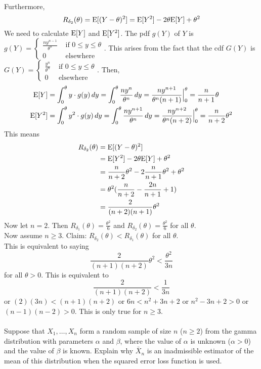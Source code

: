 \documentclass[12pt]{article}
\begin{document}
Furthermore, $$R_{\delta_2}(\theta) = \mathrm{E}[ (Y - \theta)^2 ] = \mathrm{E}[ Y^2 ] - 2\theta\mathrm{E}[ Y ] + \theta^2 $$ 
We need to calculate $\mathrm{E}[ Y ]$ and $\mathrm{E}[ Y^2 ]$. The pdf $g(Y)$ of $Y$ is $g(Y) = \begin{cases} \frac{ny^{n-1}}{\theta^n} &\text{ if } 0 \leq y \leq \theta \\ 0 &\text{ elsewhere} \end{cases} $. This arises from the fact that the cdf $G(Y)$ is $G(Y) = \begin{cases} \frac{y^n}{\theta^n} &\text{ if } 0 \leq y \leq \theta \\ 0 &\text{ elsewhere} \end{cases}$. Then, $$ \begin{aligned} 
\mathrm{E}[ Y ] &= \int_0^\theta  y \cdot g(y) \, dy = \int_0^\theta \frac{ny^n}{\theta^n} \, dy = \frac{ny^{n+1}}{\theta^n(n+1)}\Big|_0^\theta = \frac{n}{n+1}\theta \\ \mathrm{E}[ Y^2 ] &= \int_0^\theta y^2 \cdot g(y) \, dy = \int_0^\theta \frac{ny^{n+1}}{\theta^n} \, dy = \frac{ny^{n+2}}{\theta^n(n+2)}\Big|_0^\theta = \frac{n}{n+2}\theta^2 \end{aligned} $$ 
This means $$ \begin{aligned} R_{\delta_2}(\theta) &= \mathrm{E}[ (Y - \theta)^2 ] \\ &= \mathrm{E}[ Y^2 ] - 2\theta\mathrm{E}[ Y ] + \theta^2 \\ &= \frac{n}{n+2}\theta^2 - 2\frac{n}{n+1}\theta^2 + \theta^2 \\ &= \theta^2(\frac{n}{n+2} - \frac{2n}{n+1} + 1) \\ &= \frac{2}{(n+2)(n+1)}\theta^2 \end{aligned} $$ 
Now let $n=2$. Then $R_{\delta_1}(\theta) = \frac{\theta^2}{6}$ and $R_{\delta_2}(\theta) = \frac{\theta^2}{6}$ for all $\theta$. \\
Now assume $n \geq 3$. Claim: $R_{\delta_2}(\theta) < R_{\delta_1}(\theta)$ for all $\theta$. \\ This is equivalent to saying $$ \frac{2}{(n+1)(n+2)}\theta^2 < \frac{\theta^2}{3n} $$ for all $\theta > 0$. This is equivalent to $$ \frac{2}{(n+1)(n+2)} < \frac{1}{3n}$$ or $(2)(3n) < (n+1)(n+2)$ or $6n < n^2 + 3n + 2$ or $n^2 -3n + 2 > 0$ or $(n-1)(n-2) > 0$. This is only true for $n \geq 3$. \\~\\
Suppose that $X_1,\dots,X_n$ form a random sample of size $n$ ($n \geq 2$) from the gamma distribution with parameters $\alpha$ and $\beta$, where the value of $\alpha$ is unknown ($\alpha >0$) and the value of $\beta$ is known. Explain why $\bar{X}_n$ is an inadmissible estimator of the mean of this distribution when the squared error loss function is used. \\
\end{document}
